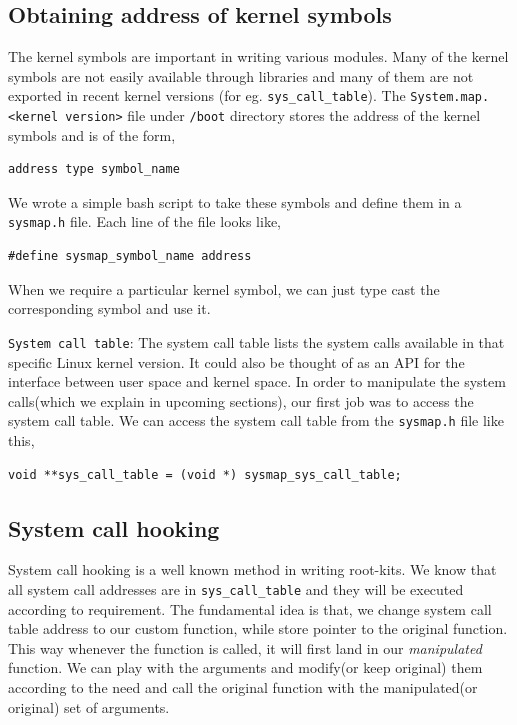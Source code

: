 \documentclass[10pt, letterpaper]{scrartcl}
\begin{document}
\subsection{Obtaining address of kernel symbols}
The kernel symbols are important in writing various modules. Many of the kernel symbols are not easily available through libraries 
and many of them are not exported in recent kernel versions (for eg. \texttt{sys\_call\_table}).
The \texttt{System.map.<kernel version>} file under \texttt{/boot} directory stores the address of the kernel symbols and is of the form, 
\begin{verbatim}
address type symbol_name
\end{verbatim}

We wrote a simple bash script to take these symbols and define them in a \texttt{sysmap.h} file. 
Each line of the file looks like, 

\begin{verbatim}
#define sysmap_symbol_name address
\end{verbatim}

When we require a particular kernel symbol, we can just type cast the corresponding symbol and use it. 

\texttt{System call table}: The system call table lists the system calls available in that specific Linux kernel version. 
It could also be thought of as an API for the interface between user space and kernel space. 
In order to manipulate the system calls(which we explain in upcoming sections), our first job was to access the system call table.
We can access the system call table from the \texttt{sysmap.h} file like this,

\begin{verbatim}
void **sys_call_table = (void *) sysmap_sys_call_table;
\end{verbatim}

\subsection{System call hooking}
System call hooking is a well known method in writing root-kits. 
We know that all system call addresses are in \texttt{sys\_call\_table} and they will be executed according to requirement.
The fundamental idea is that, we change system call table address to our custom function, 
while store pointer to the original function. This way whenever the function is called, 
it will first land in our {\em manipulated} function. 
We can play with the arguments and modify(or keep original) them according to the need and call the original function with the manipulated(or original) set of arguments. 
\end{document}
